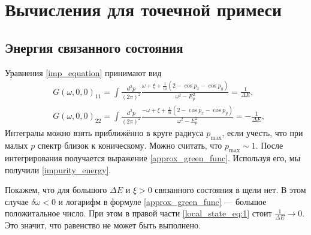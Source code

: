 \section{Вычисления для точечной примеси}
\subsection{Энергия связанного состояния}
\label{app:impurity}
Уравнения \eqref{imp_equation} принимают вид
\begin{align}
        &G(\omega,0,0)_{11} = \int \frac{d^2 p}{(2\pi)^2} 
            \frac{\omega + \xi + \frac{1}{m}(2 - \cos{p_x} - \cos{p_y})}
                 {\omega^2 - E_p^2} =\frac{1}{\Delta E}, \label{local_state_eq:1}\\
        &G(\omega,0,0)_{22} = \int \frac{d^2 p}{(2\pi)^2} 
            \frac{-\omega + \xi + \frac{1}{m}(2 - \cos{p_x} - \cos{p_y})}
                 {\omega^2 - E_p^2} =-\frac{1}{\Delta E}, \label{local_state_eq:2}
\end{align}
Интегралы можно взять приближённо в круге радиуса $p_{\mathrm{max}}$,
если учесть, что при малых $p$ спектр близок к 
коническому. Можно считать, что $p_{\mathrm{max}} \sim 1$. После интегрирования получается
выражение \eqref{approx_green_func}. Используя его, мы получили \eqref{impurity_energy}.


Покажем, что для большого $\Delta E$ и $\xi > 0$ связанного состояния в щели нет. 
В этом случае $\delta \omega < 0$ и логарифм в формуле \eqref{approx_green_func} ---
большое положитальное число. При этом в правой части \eqref{local_state_eq:1} стоит
$\frac{1}{\Delta E} \to 0$. Это значит, что равенство не может быть выполнено.


